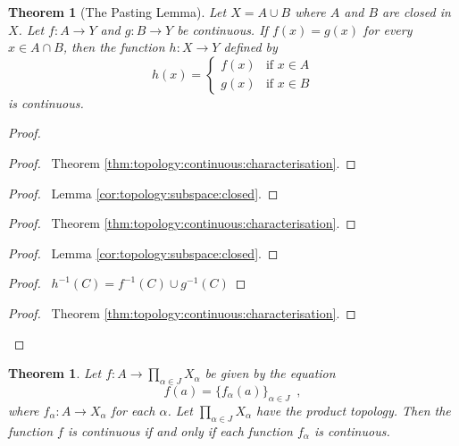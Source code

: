 \documentclass{report}
\let\qed\relax
\newtheorem{thm}[lm]{Theorem}
\theoremstyle{definition}
\begin{document}
  \begin{thm}[The Pasting Lemma]
    Let $X = A \cup B$ where $A$ and $B$ are closed in $X$. Let $f : A
    \rightarrow
    Y$ and $g : B \rightarrow Y$ be continuous. If $f(x) = g(x)$ for every $x
    \in A
    \cap B$, then the function $h : X \rightarrow Y$ defined by
    \[ h(x) = \begin{cases}
      f(x) & \text{if } x \in A \\
      g(x) & \text{if } x \in B
    \end{cases} \]
    is continuous.
  \end{thm}

  \begin{proof}
    \pf
    \begin{proof}
      \pf\ Theorem \ref{thm:topology:continuous:characterisation}.
    \end{proof}
    \begin{proof}
      \pf\ Lemma \ref{cor:topology:subspace:closed}.
    \end{proof}
    \begin{proof}
      \pf\ Theorem \ref{thm:topology:continuous:characterisation}.
    \end{proof}
    \begin{proof}
      \pf\ Lemma \ref{cor:topology:subspace:closed}.
    \end{proof}
    \begin{proof}
      \pf\ $h^{-1}(C) = f^{-1}(C) \cup g^{-1}(C)$
    \end{proof}
    \qedstep
    \begin{proof}
      \pf\ Theorem \ref{thm:topology:continuous:characterisation}.
    \end{proof}
    \qed
  \end{proof}

  \begin{thm}
    \label{thm:topology:continuous:product}
    Let $f : A \rightarrow \prod_{\alpha \in J} X_\alpha$ be given by the
    equation
    \[ f(a) = \{ f_\alpha(a) \}_{\alpha \in J} \enspace , \]
    where $f_\alpha : A \rightarrow X_\alpha$ for each $\alpha$. Let
    $\prod_{\alpha
      \in J} X_\alpha$ have the product topology. Then the function $f$ is
    continuous if and only if each function $f_\alpha$ is continuous.
  \end{thm}
\end{document}
